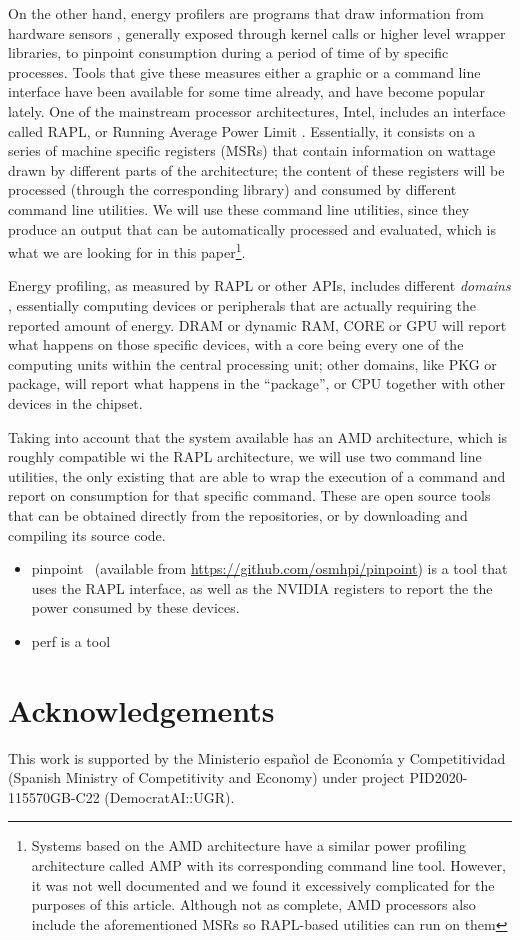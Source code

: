 \documentclass[a4paper,twoside]{article}
\begin{document}
On the other hand, energy profilers are programs that draw information from
hardware sensors \cite{sinha2001jouletrack}, generally exposed through kernel
calls or higher level wrapper libraries, to pinpoint consumption during a period
of time of by specific processes. Tools that give these measures either a
graphic or a command line interface have been available for some time already,
and have become popular lately. One of the mainstream processor architectures,
Intel, includes an interface called RAPL, or Running Average Power Limit
\cite{rapl}. Essentially, it consists on a series of machine specific registers
(MSRs) that contain information on wattage drawn by different parts of the
architecture; the content of these registers will be processed (through the
corresponding library) and consumed by different command line utilities. We will
use these command line utilities, since they produce an output that can be
automatically processed and evaluated, which is what we are looking for in this
paper\footnote{Systems based on the AMD architecture have a similar power
  profiling architecture called AMP with its corresponding command line
  tool. However, it was not well documented and we found it excessively
  complicated for the purposes of this article. Although not as complete, AMD
  processors also include the aforementioned MSRs so RAPL-based utilities can
  run on them}.

Energy profiling, as measured by RAPL or other APIs, includes different
\emph{domains} \cite{khan2015energy}, essentially computing devices or
peripherals that are actually requiring the reported amount of energy. DRAM or
dynamic RAM, CORE or GPU will report what happens on those specific devices,
with a core being every one of the computing units within the central processing
unit; other domains, like PKG or package, will report what happens in the
``package'', or CPU together with other devices in the chipset.

Taking into account that the system available has an AMD architecture, which is
roughly compatible wi the RAPL architecture, we will use two command line
utilities, the only existing that are able to wrap the execution of a command
and report on consumption for that specific command. These are open source tools
that can be obtained directly from the repositories, or by downloading and
compiling its source code. \begin{itemize}
\item {\sf pinpoint}~\cite{9307947} (available from
  \url{https://github.com/osmhpi/pinpoint}) is a tool that uses the RAPL
  interface, as well as the NVIDIA registers to report the the power consumed by
  these devices.
\item {\sf perf} is a tool
  \end{itemize}

\section*{Acknowledgements}

This work is supported by the Ministerio espa\~{n}ol de Econom\'{\i}a y
Competitividad (Spanish Ministry of Competitivity and Economy) under project
PID2020-115570GB-C22 (DemocratAI::UGR).



{\small
}
\end{document}
